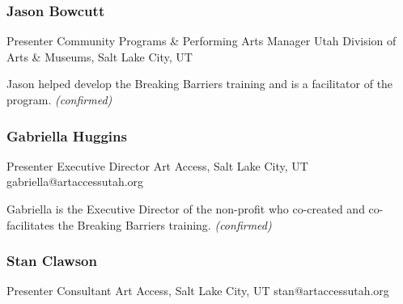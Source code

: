 \documentclass{report}
\begin{document}
              

              
                \subsubsection*{ Jason Bowcutt }
                Presenter\newline
                Community Programs \& Performing Arts Manager\newline
                Utah Division of Arts \& Museums, Salt Lake City, UT
                \newline
                
                
                

                Jason helped develop the Breaking Barriers training and is a facilitator of the program.
                \emph{ (confirmed) }
              

              
                \subsubsection*{ Gabriella Huggins }
                Presenter\newline
                Executive Director\newline
                Art Access, Salt Lake City, UT
                \newline
                gabriella@artaccessutah.org\newline
                
                

                Gabriella is the Executive Director of the non-profit who co-created and co-facilitates the Breaking Barriers training.
                \emph{ (confirmed) }
              

              
                \subsubsection*{ Stan Clawson }
                Presenter\newline
                Consultant\newline
                Art Access, Salt Lake City, UT
                \newline
                stan@artaccessutah.org\newline
                
                
\end{document}
